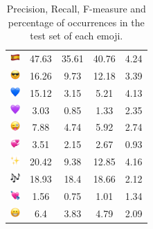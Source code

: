 \documentclass{article}
\begin{document}
\begin{table}
\begin{tabular}{|c|ccc|c|}
\includegraphics[height=0.37cm,width=0.37cm]{img/Spain.png} & 47.63 & 35.61 & 40.76 & 4.24\\ 
\includegraphics[height=0.37cm,width=0.37cm]{img/smiling_face_with_sunglasses.png} & 16.26 & 9.73 & 12.18 & 3.39\\ 
\includegraphics[height=0.37cm,width=0.37cm]{img/blue_heart.png} & 15.12 & 3.15 & 5.21 & 4.13\\ 
\includegraphics[height=0.37cm,width=0.37cm]{img/purple_heart.png} & 3.03 & 0.85 & 1.33 & 2.35\\ 
\includegraphics[height=0.37cm,width=0.37cm]{img/winking_face_with_tongue.png} & 7.88 & 4.74 & 5.92 & 2.74\\ 
\includegraphics[height=0.37cm,width=0.37cm]{img/revolving_hearts.png} & 3.51 & 2.15 & 2.67 & 0.93\\ 
\includegraphics[height=0.37cm,width=0.37cm]{img/sparkles.png} & 20.42 & 9.38 & 12.85 & 4.16\\ 
\includegraphics[height=0.37cm,width=0.37cm]{img/musical_notes.png} & 18.93 & 18.4 & 18.66 & 2.12\\ 
\includegraphics[height=0.37cm,width=0.37cm]{img/heart_with_arrow.png} & 1.56 & 0.75 & 1.01 & 1.34\\ 
\includegraphics[height=0.37cm,width=0.37cm]{img/beaming_face_with_smiling_eyes.png} & 6.4 & 3.83 & 4.79 & 2.09\\ 

\hline
\end{tabular}
\caption{\label{table:emoji_detailed} Precision, Recall, F-measure and percentage of occurrences in the test set of each emoji.}
\end{table}
\end{document}
